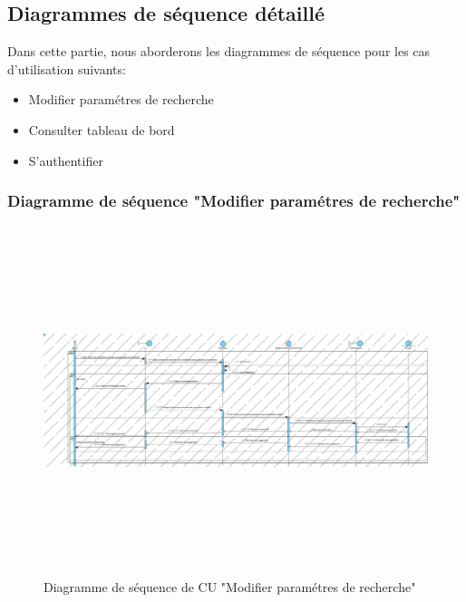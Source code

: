 \subsection{Diagrammes de séquence détaillé}
\noindent
Dans cette partie, nous aborderons les diagrammes de séquence pour les cas
d'utilisation suivants:
\begin{itemize}
	\item Modifier paramétres de recherche
	\item Consulter tableau de bord
	\item S'authentifier
\end{itemize}

\subsubsection{Diagramme de séquence "Modifier paramétres de recherche"}
\begin{figure}[H]
	\centering
	\includegraphics[width=1\textwidth,height=4in]{logos/modifierparametres.png}
	\caption{Diagramme de séquence de CU "Modifier paramétres de recherche"}
	\label{fig:modifierparametres}
\end{figure}

